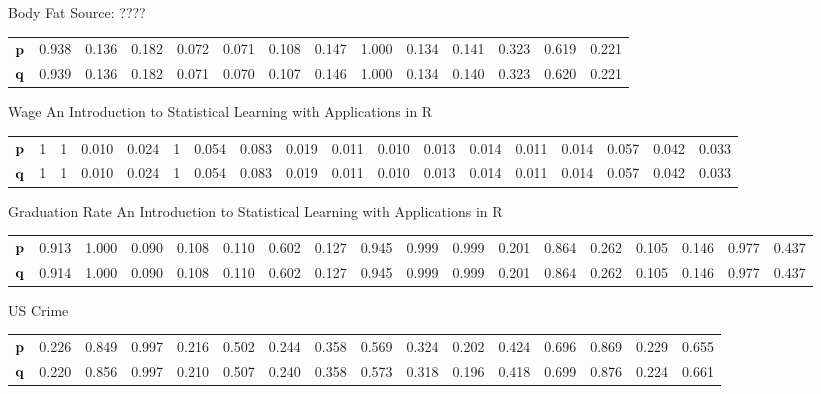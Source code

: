 \documentclass{amsart}[12pt]
\begin{document}
Body Fat
Source: ????

\begin{tabular}{llllllllllllll}
	${\bf p}$ & 0.938 & 0.136 & 0.182 & 0.072 & 0.071 & 0.108 & 0.147 & 1.000 & 0.134 & 0.141 & 0.323 & 0.619 & 0.221 \\
	${\bf q}$ & 0.939 & 0.136 & 0.182 & 0.071 & 0.070 & 0.107 & 0.146 & 1.000 & 0.134 & 0.140 & 0.323 & 0.620 & 0.221 \\
\end{tabular}

Wage
An Introduction to Statistical Learning with Applications in R

\begin{tabular}{llllllllllllllllll}
	${\bf p}$ & 1 & 1 & 0.010 & 0.024 & 1 & 0.054 & 0.083 & 0.019 & 0.011 & 0.010 & 0.013 & 0.014 & 0.011 & 0.014 & 0.057 & 0.042 & 0.033 \\
	${\bf q}$ & 1 & 1 & 0.010 & 0.024 & 1 & 0.054 & 0.083 & 0.019 & 0.011 & 0.010 & 0.013 & 0.014 & 0.011 & 0.014 & 0.057 & 0.042 & 0.033 \\
\end{tabular}

Graduation Rate
An Introduction to Statistical Learning with Applications in R

\begin{tabular}{llllllllllllllllll}
	${\bf p}$ & 0.913 & 1.000 & 0.090 & 0.108 & 0.110 & 0.602 & 0.127 & 0.945 & 0.999 & 0.999 & 0.201 & 0.864 & 0.262 & 0.105 & 0.146 & 0.977 & 0.437 \\
	${\bf q}$ & 0.914 & 1.000 & 0.090 & 0.108 & 0.110 & 0.602 & 0.127 & 0.945 & 0.999 & 0.999 & 0.201 & 0.864 & 0.262 & 0.105 & 0.146 & 0.977 & 0.437 \\
\end{tabular}

US Crime

\begin{tabular}{llllllllllllllll}
	${\bf p}$ & 0.226 & 0.849 & 0.997 & 0.216 & 0.502 & 0.244 & 0.358 & 0.569 & 0.324 & 0.202 & 0.424 & 0.696 & 0.869 & 0.229 & 0.655 \\
	${\bf q}$ & 0.220 & 0.856 & 0.997 & 0.210 & 0.507 & 0.240 & 0.358 & 0.573 & 0.318 & 0.196 & 0.418 & 0.699 & 0.876 & 0.224 & 0.661 \\
\end{tabular}
\end{document}
